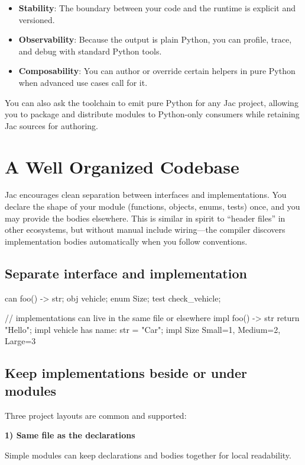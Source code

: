 \begin{itemize}
    \item \textbf{Stability}: The boundary between your code and the runtime is explicit and versioned.
    \item \textbf{Observability}: Because the output is plain Python, you can profile, trace, and debug with standard Python tools.
    \item \textbf{Composability}: You can author or override certain helpers in pure Python when advanced use cases call for it.
\end{itemize}

You can also ask the toolchain to emit pure Python for any Jac project, allowing you to package and distribute modules to Python-only consumers while retaining Jac sources for authoring.

\section{A Well Organized Codebase}
Jac encourages clean separation between interfaces and implementations. You declare the shape of your module (functions, objects, enums, tests) once, and you may provide the bodies elsewhere. This is similar in spirit to ``header files'' in other ecosystems, but without manual include wiring—the compiler discovers implementation bodies automatically when you follow conventions.

\subsection*{Separate interface and implementation}
\begin{jacblock}
can foo() -> str;
obj vehicle;
enum Size;
test check_vehicle;

// implementations can live in the same file or elsewhere
impl foo() -> str { return "Hello"; }
impl vehicle { has name: str = "Car"; }
impl Size { Small=1, Medium=2, Large=3 }
\end{jacblock}

\subsection*{Keep implementations beside or under modules}
Three project layouts are common and supported:

\textbf{1) Same file as the declarations}

Simple modules can keep declarations and bodies together for local readability.

